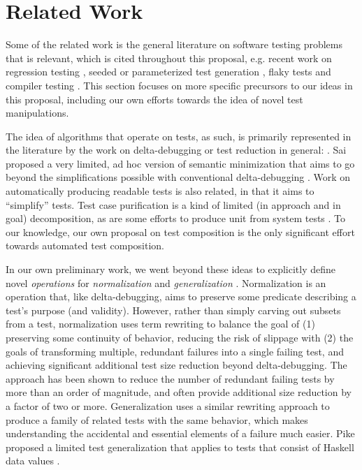 \section{Related Work}

Some of the related work is the general literature on software testing
problems \cite{anand2013orchestrated,orsofuse}
that is relevant, which is cited throughout this proposal, e.g. recent
work on regression testing
\cite{YooHarman,rothermel01oct,SelectTest,Graves:2001:ESR:367008.367020,STVR:STVR263},
seeded or parameterized test generation
\cite{aflfuzz, Jin:2012:BRF:2337223.2337279,Person:2011:DIS:1993498.1993558,Marinescu:2012:MTS:2337223.2337308,TaoParam,BugRedux,tillmann2005parameterized}, flaky tests \cite{memon2017taming,miccoflaky,Gao:2015:MSU:2818754.2818764,LamZE2015,palomba2017does,luo2014empirical} and
compiler testing \cite{KCC,EllisonRosu12POPL,Hathhorn,csmith,ZhendongPLDI14,ZhendongPLDI17}.  This section
focuses on more specific precursors to our ideas in this proposal,
including our own efforts towards the idea of novel test manipulations.

The idea of algorithms that operate on tests, as such, is
primarily represented in the literature by the work on
delta-debugging or test reduction in general:
\cite{DD,HDD,TCminim,MinUnit,CReduce,Lithium,ZellerBook,DDISSTA,IsolThread,Yesterday}.
Sai proposed a very limited, ad hoc
version of semantic minimization that aims to go beyond the simplifications possible with
conventional delta-debugging \cite{SaiSimple}.  Work on automatically producing readable tests \cite{Guava,Readable} is also
related, in that it aims to ``simplify'' tests.  Test case
purification \cite{PureTest} is a kind of limited (in approach and in
goal) decomposition, as are some efforts to produce unit from system
tests \cite{OrsoKennedy05WODA,
  SaffETAL05ASE, JordeETAL08ASE, ElbaumETAL06FSE}.  To our knowledge,
our own proposal on test composition \cite{tecpscompose} is the only
significant effort towards automated test composition.

In our own preliminary work, we went beyond these ideas to explicitly define
novel \emph{operations} for \emph{normalization} and
\emph{generalization} \cite{OneTest}.  Normalization is an operation that, like
delta-debugging, aims to preserve some predicate describing a test's
purpose (and validity).  However, rather than simply carving out
subsets from a test, normalization uses term rewriting to balance the
goal of (1) preserving some continuity of behavior, reducing the risk
of slippage \cite{slippageFSE} with (2) the goals of transforming multiple,
redundant failures into a single failing test, and achieving
significant additional test size reduction beyond delta-debugging.
The approach has been shown to reduce the number of redundant failing
tests by more than an order of magnitude, and often provide additional
size reduction by a factor of two or more.  Generalization \cite{OneTest} uses a
similar rewriting approach to produce a family of related tests with
the same behavior, which makes understanding the accidental and
essential elements of a failure much easier.   Pike proposed a limited test
generalization that applies to tests that consist of Haskell data
values \cite{SmartCheck}.

